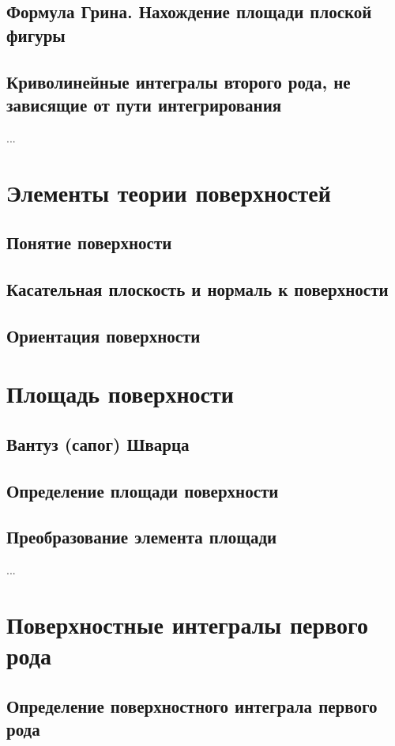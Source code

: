 \subsection{Формула Грина. Нахождение площади плоской фигуры}
\subsection{Криволинейные интегралы второго рода, не зависящие от пути интегрирования}
...

\section{Элементы теории поверхностей}
\subsection{Понятие поверхности}

\subsection{Касательная плоскость и нормаль к поверхности}

\subsection{Ориентация поверхности}


\section{Площадь поверхности}
\subsection{Вантуз (сапог) Шварца}
\subsection{Определение площади поверхности}
\subsection{Преобразование элемента площади}
...

\section{Поверхностные интегралы первого рода}
\subsection{Определение поверхностного интеграла первого рода}
